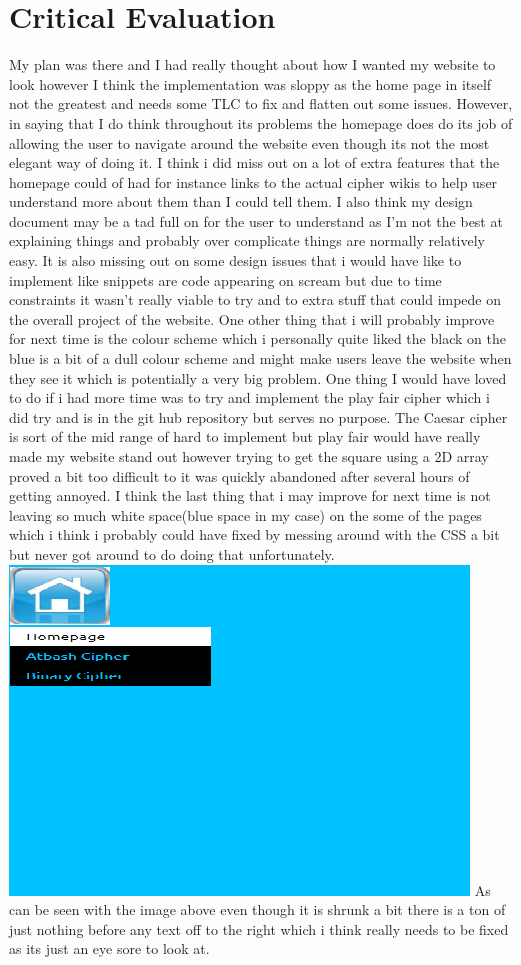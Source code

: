 \documentclass[10pt, a4paper]{article}
\begin{document}
\section{Critical Evaluation}
My plan was there and I had really thought about how I wanted my website to look however I think the implementation was sloppy as the home page in itself not the greatest and needs some TLC to fix and flatten out some issues. However, in saying that I do think throughout its problems the homepage does do its job of allowing the user to navigate around the website even though its not the most elegant way of doing it. I think i did miss out on a lot of extra features that the homepage could of had for instance links to the actual cipher wikis to help user understand more about them than I could tell them. I also think my design document may be a tad full on for the user to understand as I'm not the best at explaining things and probably over complicate things are normally relatively easy. It is also missing out on some design issues that i would have like to implement like snippets are code appearing on scream but due to time constraints it wasn't really viable to try and to extra stuff that could impede on the overall project of the website. One other thing that i will probably improve for next time is the colour scheme which i personally quite liked the black on the blue is a bit of a dull colour scheme and might make users leave the website when they see it which is potentially a very big problem. One thing I would have loved to do if i had more time was to try and implement the play fair cipher which i did try and is in the git hub repository but serves no purpose. The Caesar cipher is sort of the mid range of hard to implement but play fair would have really made my website stand out however trying to get the square using a 2D array proved a bit too difficult to it was quickly abandoned after several hours of getting annoyed. I think the last thing that i may improve for next time is not leaving so much white space(blue space in my case) on the some of the pages which i think i probably could have fixed by messing around with the CSS a bit but never got around to do doing that unfortunately.
\includegraphics{images/WhiteSpace.png}
As can be seen with the image above even though it is shrunk a bit there is a ton of just nothing before any text off to the right which i think really needs to be fixed as its just an eye sore to look at.
\end{document}
